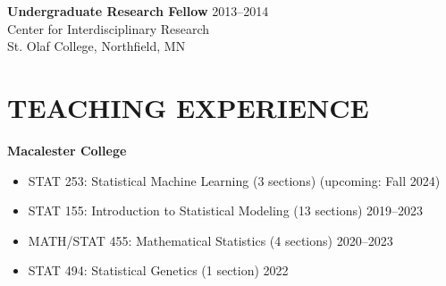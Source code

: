 \documentclass[margin]{res}
\begin{document}
\begin{resume}
\textbf{Undergraduate Research Fellow} \hfill 2013--2014 \\
Center for Interdisciplinary Research \\
St. Olaf College, Northfield, MN \\


\section{TEACHING EXPERIENCE}

\textbf{Macalester College}
\begin{itemize}
\item STAT 253: Statistical Machine Learning (3 sections) \hfill (upcoming: Fall 2024)
\item STAT 155: Introduction to Statistical Modeling (13 sections)  \hfill 2019--2023
\item MATH/STAT 455: Mathematical Statistics (4 sections) \hfill 2020--2023 
\item STAT 494: Statistical Genetics (1 section) \hfill 2022 \\
\end{itemize}



\end{resume}
\end{document}
